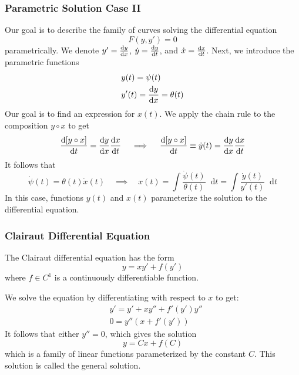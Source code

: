 \documentclass[11pt, a4paper]{article}
\newcommand{\diff}{\mathop{}\!\mathrm{d}} %
\begin{document}
\subsubsection{Parametric Solution Case II}
Our goal is to describe the family of curves solving the differential equation
\begin{equation*}
	F(y, y') = 0
\end{equation*}	
parametrically. We denote $ y' = \dv{y}{x} $, $ \dot{y} = \dv{y}{t} $, and $ \dot{x} = \dv{x}{t} $. Next, we introduce the parametric functions
\begin{align*}
	& y(t) = \psi(t)\\
	& y'(t) = \dv{y}{x} (t) = \theta (t)
\end{align*}
Our goal is to find an expression for $ x(t) $. We apply the chain rule to the composition $ y \circ x $ to get
\begin{align*}
	\dv{[y \circ x]}{t} = \dv{y}{x} \dv{x}{t} \quad \implies \quad \dv{[y \circ x]}{t} \equiv \dot{y}(t) = \dv{y}{x} \dv{x}{t}
\end{align*}
It follows that
\begin{equation*}
	\dot{\psi}(t) = \theta(t) \dot{x}(t) \quad \implies \quad x(t) = \int \frac{\dot{\psi}(t)}{\theta(t)}  \diff t = \int \frac{\dot{y}(t)}{y'(t)}  \diff t 
\end{equation*}
In this case, functions $ y(t) $ and $ x(t) $ parameterize the solution to the differential equation.

\subsubsection{Clairaut Differential Equation}
The Clairaut differential equation has the form
\begin{equation*}
	y = x y' + f(y')
\end{equation*}
where $ f \in C^{1} $ is a continuously differentiable function.

We solve the equation by differentiating with respect to $ x $ to get:
\begin{align*}
	& y' = y' + xy'' + f'(y') y''\\
	& 0 = y''(x + f'(y'))
\end{align*}
It follows that either $ y'' = 0 $, which gives the solution 
\begin{equation*}
	y = Cx + f(C)
\end{equation*}
which is a family of linear functions parameterized by the constant $ C $. This solution is called the general solution.
\end{document}
